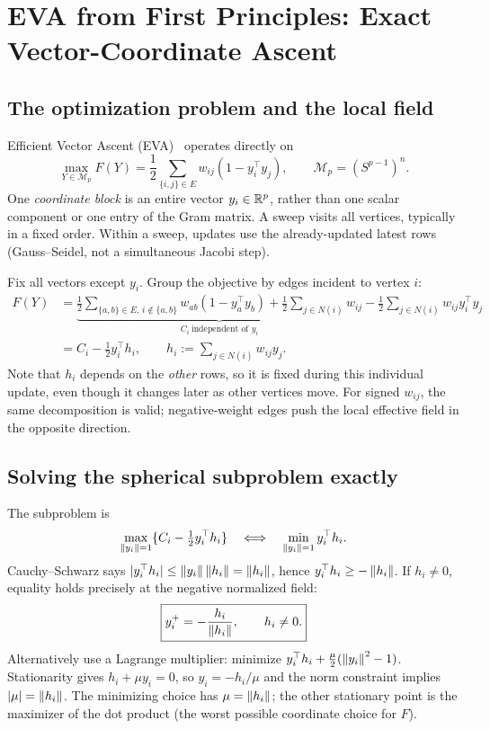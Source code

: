 \chapter{EVA from First Principles: Exact Vector-Coordinate Ascent}\label{ch:eva}
\section{The optimization problem and the local field}
Efficient Vector Ascent (EVA)~\cite{eva2026} operates directly on
\begin{equation}\label{eq:eva-problem}
\max_{Y\in\mathcal M_p}F(Y)=\frac12\sum_{\{i,j\}\in E}w_{ij}(1-y_i^\top y_j),\qquad \mathcal M_p=(S^{p-1})^n.
\end{equation}
One \emph{coordinate block} is an entire vector $y_i\in\mathbb{R}^p$, rather than one scalar component or one entry of the Gram matrix. A sweep visits all vertices, typically in a fixed order. Within a sweep, updates use the already-updated latest rows (Gauss--Seidel, not a simultaneous Jacobi step).

Fix all vectors except $y_i$. Group the objective by edges incident to vertex $i$:
\begin{align}
F(Y)&=\underbrace{\frac12\sum_{\{a,b\}\in E,\,i\notin\{a,b\}}w_{ab}(1-y_a^\top y_b)+\frac12\sum_{j\in N(i)}w_{ij}}_{C_i\ \text{independent of }y_i}
-\frac12\sum_{j\in N(i)}w_{ij}y_i^\top y_j\\
&=C_i-\frac12 y_i^\top h_i,\qquad h_i:=\sum_{j\in N(i)}w_{ij}y_j.\label{eq:field-decomp}
\end{align}
Note that $h_i$ depends on the \emph{other} rows, so it is fixed during this individual update, even though it changes later as other vertices move. For signed $w_{ij}$, the same decomposition is valid; negative-weight edges push the local effective field in the opposite direction.

\section{Solving the spherical subproblem exactly}
The subproblem is
\begin{equation}\label{eq:local-sub}
\max_{\left\lVert y_i\right\rVert=1}\{C_i-\tfrac12y_i^\top h_i\}\quad\Longleftrightarrow\quad\min_{\left\lVert y_i\right\rVert=1}y_i^\top h_i.
\end{equation}
Cauchy--Schwarz says $|y_i^\top h_i|\le\left\lVert y_i\right\rVert\left\lVert h_i\right\rVert=\left\lVert h_i\right\rVert$, hence $y_i^\top h_i\ge-\left\lVert h_i\right\rVert$. If $h_i\ne0$, equality holds precisely at the negative normalized field:
\begin{equation}\label{eq:eva-update}
\boxed{y_i^{+}=-\frac{h_i}{\left\lVert h_i\right\rVert},\qquad h_i\ne0.}
\end{equation}
Alternatively use a Lagrange multiplier: minimize $y_i^\top h_i+\frac\mu2(\left\lVert y_i\right\rVert^2-1)$. Stationarity gives $h_i+\mu y_i=0$, so $y_i=-h_i/\mu$ and the norm constraint implies $|\mu|=\left\lVert h_i\right\rVert$. The minimizing choice has $\mu=\left\lVert h_i\right\rVert$; the other stationary point is the maximizer of the dot product (the worst possible coordinate choice for $F$).


